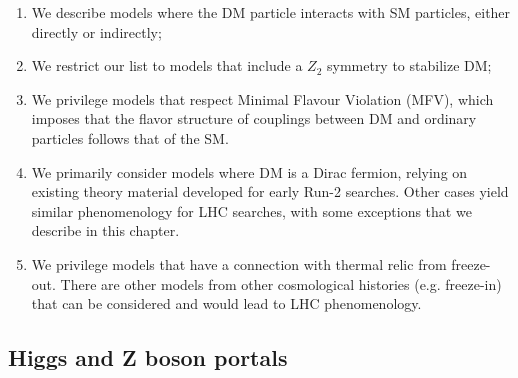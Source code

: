 \begin{enumerate}

\item We describe models where the DM particle interacts with SM particles, either directly or indirectly;
\item We restrict our list to models that include a $Z_2$ symmetry to stabilize DM;
\item We privilege models that respect Minimal Flavour Violation (MFV), which imposes that the flavor structure of couplings between DM and ordinary particles follows that of the SM.  %
\item We primarily consider models where DM is a Dirac fermion, relying on existing theory material developed for early Run-2 searches. Other cases yield similar phenomenology for LHC searches, with some exceptions that we describe in this chapter. 
\item We privilege models that have a connection with thermal relic from freeze-out. There are other models from other cosmological histories (e.g. freeze-in) that can be considered and would lead to LHC phenomenology. 
%
\end{enumerate}

\subsection{Higgs and Z boson portals}
\label{sec:HZPortalModels}

